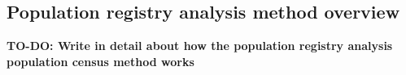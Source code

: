 \subsection{Population registry analysis method overview}
\textbf{TO-DO: Write in detail about how the population registry analysis population census method works}
